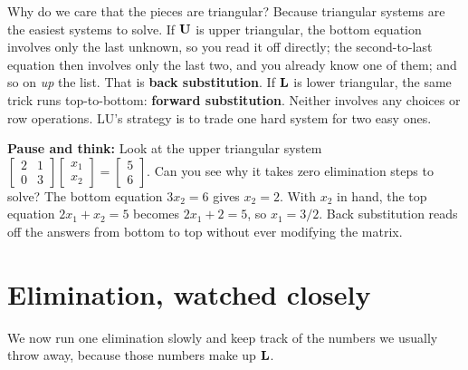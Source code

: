 Why do we care that the pieces are triangular? Because triangular systems are the easiest
systems to solve. If $\mathbf{U}$ is upper triangular, the bottom equation
involves only the last unknown, so you read it off directly; the second-to-last equation
then involves only the last two, and you already know one of them; and so on \emph{up} the
list. That is \textbf{back substitution}. If $\mathbf{L}$ is lower triangular, the same trick
runs top-to-bottom: \textbf{forward substitution}. Neither involves any choices or row
operations. LU's strategy is to trade one hard system for two easy ones.

\begin{recoverybox}
\textbf{Pause and think:} Look at the upper triangular system $\begin{bmatrix}2 & 1 \\ 0 & 3\end{bmatrix} \begin{bmatrix}x_1 \\ x_2\end{bmatrix} = \begin{bmatrix}5 \\ 6\end{bmatrix}$. Can you see why it takes zero elimination steps to solve? The bottom equation $3x_2 = 6$ gives $x_2 = 2$. With $x_2$ in hand, the top equation $2x_1 + x_2 = 5$ becomes $2x_1 + 2 = 5$, so $x_1 = 3/2$. Back substitution reads off the answers from bottom to top without ever modifying the matrix.
\end{recoverybox}

\section{Elimination, watched closely}
\label{ch09:elim-watched}

We now run one elimination slowly and keep track of the numbers we usually throw away,
because those numbers make up $\mathbf{L}$.


